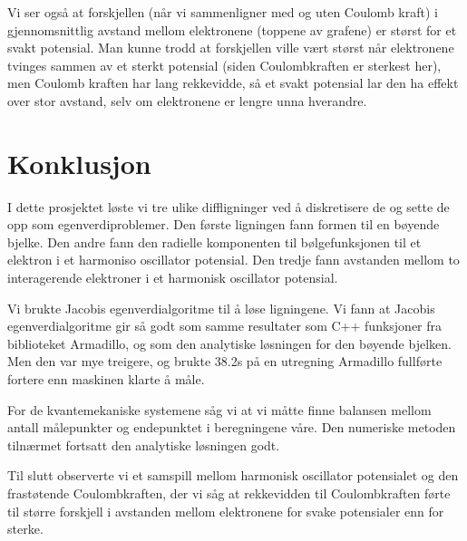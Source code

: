 \documentclass[reprint,english,notitlepage]{revtex4-1}
\begin{document}
	Vi ser også at forskjellen (når vi sammenligner med og uten Coulomb kraft) i gjennomsnittlig avstand mellom elektronene (toppene av grafene) er størst for et svakt potensial. Man kunne trodd at forskjellen ville vært størst når elektronene tvinges sammen av et sterkt potensial (siden Coulombkraften er sterkest her), men Coulomb kraften har lang rekkevidde, så et svakt potensial lar den ha effekt over stor avstand, selv om elektronene er lengre unna hverandre.


\section{Konklusjon} %
	I dette prosjektet løste vi tre ulike diffligninger ved å diskretisere de og sette de opp som egenverdiproblemer. Den første ligningen fann formen til en bøyende bjelke. Den andre fann den radielle komponenten til bølgefunksjonen til et elektron i et harmoniso oscillator potensial. Den tredje fann avstanden mellom to interagerende elektroner i et harmonisk oscillator potensial.
	
	Vi brukte Jacobis egenverdialgoritme til å løse ligningene. Vi fann at Jacobis egenverdialgoritme gir så godt som samme resultater som C++ funksjoner fra biblioteket Armadillo, og som den analytiske løsningen for den bøyende bjelken. Men den var mye treigere, og brukte 38.2s på en utregning Armadillo fullførte fortere enn maskinen klarte å måle.
	
	For de kvantemekaniske systemene såg vi at vi måtte finne balansen mellom antall målepunkter og endepunktet i beregningene våre. Den numeriske metoden tilnærmet fortsatt den analytiske løsningen godt.
	
	Til slutt observerte vi et samspill mellom harmonisk oscillator potensialet og den frastøtende Coulombkraften, der vi såg at rekkevidden til Coulombkraften førte til større forskjell i avstanden mellom elektronene for svake potensialer enn for sterke.

\begin{figure}  \end{figure}
	
\end{document}
